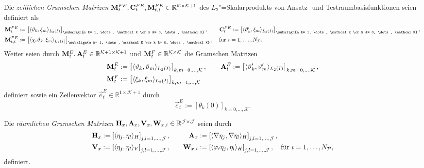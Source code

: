 \documentclass[../main.tex]{subfiles}
\begin{document}
\begin{Definition}
\label{definition:zeitliche_bausteine}
    Die \emph{zeitlichen Gramschen Matrizen} $\mathbf{M}_{t}^{FE}, \mathbf{C}_{t}^{FE}, \mathbf{M}_{t,i}^{FE} \in \mathbb{R}^{\mathcal K \times \mathcal K + 1}$ des $L_{2}$"=Skalarprodukts von Ansatz- und Testraumbasisfunktionen seien definiert als
    \begin{align}
        \mat{M}_{t}^{FE} &:= \left[ \skp{\theta_{k}}{\xi_{m}}{L_{2}(I)} \right]_{\subalign{m &= 1, \dots, \mathcal K \cr k &= 0, \dots, \mathcal K}},
        \qquad
        \mat{C}_{t}^{FE} := \left[ \skp{\theta_{k}'}{\xi_{m}}{L_{2}(I)} \right]_{\subalign{m &= 1, \dots, \mathcal K \cr k &= 0, \dots, \mathcal K}},
        \\
        \mat{M}_{t,i}^{FE} &:= \left[ \skp{\chi_{i}\theta_{k}}{\xi_{m}}{L_{2}(I)} \right]_{\subalign{m &= 1, \dots, \mathcal K \cr k &= 0, \dots, \mathcal K}}, \quad \text{für } i = 1, \dots, N_{\mathcal P}.
    \end{align}
    Weiter seien durch $\mathbf{M}_{t}^{E}, \mathbf{A}_{t}^{E} \in \mathbb{R}^{\mathcal K + 1\times \mathcal K + 1}$ und $\mathbf{M}_{t}^{F} \in \mathbb{R}^{\mathcal K \times \mathcal K}$ die Gramschen Matrizen
    \begin{align}
        \mathbf{M}_{t}^{E} &:= \left[ \langle\vartheta_{k},\vartheta_{m}\rangle_{L_{2}(I)}\right]_{k,m = 0, \dots, \mathcal K},
        \qquad
        \mathbf{A}_{t}^{E} := \left[ \langle\vartheta_{k}',\vartheta_{m}'\rangle_{L_{2}(I)}\right]_{k,m = 0, \dots, \mathcal K},
        \\
        \mathbf{M}_{t}^{F} &:= \left[ \langle\xi_{k},\xi_{m}\rangle_{L_{2}(I)}\right]_{k,m = 1, \dots, \mathcal K}
    \end{align}
    definiert sowie ein Zeilenvektor $\vec{e}^{E}_{t} \in \mathbb{R}^{1 \times \mathcal K + 1}$ durch
    \begin{equation}
        \vec{e}^{E}_{t} := \left[ \theta_{k}(0) \right]_{k = 0, \dots, \mathcal K}.
    \end{equation}
\end{Definition}

\begin{Definition}
\label{definition:raeumliche_bausteine}
    Die \emph{räumlichen Gramschen Matrizen} $\mathbf{H}_{x}, \mathbf{A}_{x}, \mathbf{V}_{x}, \mathbf{W}_{x,i} \in \mathbb{R}^{\mathcal J \times \mathcal J}$ seien durch
    \begin{equation}
    \begin{aligned}
        \mathbf{H}_{x} &:= \left[ \langle\eta_{j},\eta_{l}\rangle_{H} \right]_{j,l=1, \dots, \mathcal J},&
        \quad
        \mathbf{A}_{x} &:= \left[ \langle\nabla \eta_{j},\nabla \eta_{l}\rangle_{H} \right]_{j,l=1, \dots, \mathcal J},
        \\
        \mathbf{V}_{x} &:= \left[ \langle\eta_{j},\eta_{l}\rangle_{V} \right]_{j,l = 1, \dots, \mathcal J},&
        \quad
        \mathbf{W}_{x,i} &:= \left[ \langle\varphi_{i} \eta_{j},\eta_{l}\rangle_{H} \right]_{j, l = 1, \dots, \mathcal J}, \quad \text{für } i = 1, \dots, N_{\mathcal P},
    \end{aligned}
    \end{equation}
    definiert.
\end{Definition}
\end{document}
